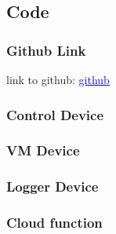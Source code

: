 \documentclass{article}
\begin{document}
\subsection*{Code}
\subsubsection*{Github Link}
link to github: \href{https://github.com/gaapaul/IotClassProject/tree/master/class_project}{\textcolor{blue}{\underline{github}}}
\subsubsection*{Control Device}

\subsubsection*{VM Device}

\subsubsection*{Logger Device}

\subsubsection*{Cloud function}


\printbibliography
\end{document}
